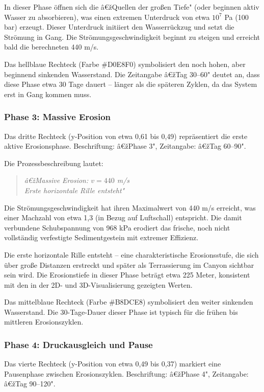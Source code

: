 In dieser Phase öffnen sich die â€žQuellen der großen Tiefe" (oder beginnen aktiv Wasser zu absorbieren), was einen extremen Unterdruck von etwa $10^7$ Pa (100 bar) erzeugt. Dieser Unterdruck initiiert den Wasserrückzug und setzt die Strömung in Gang. Die Strömungsgeschwindigkeit beginnt zu steigen und erreicht bald die berechneten 440 m/s.

Das hellblaue Rechteck (Farbe \#D0E8F0) symbolisiert den noch hohen, aber beginnend sinkenden Wasserstand. Die Zeitangabe â€žTag 30--60" deutet an, dass diese Phase etwa 30 Tage dauert -- länger als die späteren Zyklen, da das System erst in Gang kommen muss.

\subsubsection*{Phase 3: Massive Erosion}

Das dritte Rechteck (y-Position von etwa 0,61 bis 0,49) repräsentiert die erste aktive Erosionsphase. Beschriftung: â€žPhase 3", Zeitangabe: â€žTag 60--90".

Die Prozessbeschreibung lautet:
\begin{quote}
\textit{â€žMassive Erosion: $v = 440$ m/s\\
Erste horizontale Rille entsteht"}
\end{quote}

Die Strömungsgeschwindigkeit hat ihren Maximalwert von 440 m/s erreicht, was einer Machzahl von etwa 1,3 (in Bezug auf Luftschall) entspricht. Die damit verbundene Schubspannung von 968 kPa erodiert das frische, noch nicht vollständig verfestigte Sedimentgestein mit extremer Effizienz.

Die erste horizontale Rille entsteht -- eine charakteristische Erosionsstufe, die sich über große Distanzen erstreckt und später als Terrassierung im Canyon sichtbar sein wird. Die Erosionstiefe in dieser Phase beträgt etwa 225 Meter, konsistent mit den in der 2D- und 3D-Visualisierung gezeigten Werten.

Das mittelblaue Rechteck (Farbe \#B8DCE8) symbolisiert den weiter sinkenden Wasserstand. Die 30-Tage-Dauer dieser Phase ist typisch für die frühen bis mittleren Erosionszyklen.

\subsubsection*{Phase 4: Druckausgleich und Pause}

Das vierte Rechteck (y-Position von etwa 0,49 bis 0,37) markiert eine Pausenphase zwischen Erosionszyklen. Beschriftung: â€žPhase 4", Zeitangabe: â€žTag 90--120".

